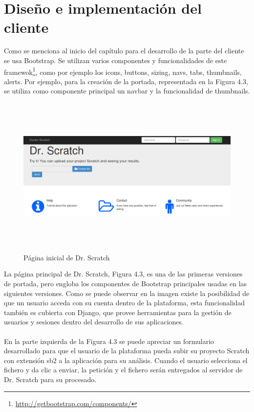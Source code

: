 \documentclass[a4paper, 12pt]{book}
\begin{document}
\section{Diseño e implementación del cliente}
\label{sec:servidor}

Como se menciona al inicio del capítulo para el desarrollo de la parte del cliente se usa
Bootstrap. Se utilizan varios componentes y funcionalidades de este
 framewok\footnote{\url{http://getbootstrap.com/components/}}, como por ejemplo los icons,
buttons, sizing, navs, tabs, thumbnails, alerts. Por ejemplo, para la creación de la 
portada, representada en la Figura 4.3, se utiliza como componente principal un navbar y la
funcionalidad de thumbnails. \\

 \begin{figure}[h]
		\centering
		\graphicspath{{img/}}
    \includegraphics[bb=0 0 800 600, width=15cm, height=8cm, keepaspectratio]{portada.png}
		\caption{Página inicial de Dr. Scratch}
    \label{figura:foro_hilos}
 \end{figure} 

La página principal de Dr. Scratch, Figura 4.3, es una de las primeras 
versiones de portada, pero engloba los componentes de Bootstrap principales 
usadas en las siguientes versiones. Como se puede observar en la imagen existe la 
posibilidad de que un usuario acceda con su cuenta dentro de la plataforma, esta
funcionalidad también es cubierta con Django, que provee herramientas para la 
gestión de usuarios y sesiones dentro del desarrollo de sus aplicaciones. \\ \\ 

En la parte izquierda de la Figura 4.3 se puede apreciar un formulario desarrollado
para que el usuario de la plataforma pueda subir su proyecto Scratch con extensión sb2
a la aplicación para su análisis. Cuando el usuario selecciona el fichero y da clic
a enviar, la petición y el fichero serán entregados al servidor de Dr. Scratch para
su procesado. \\
\end{document}

